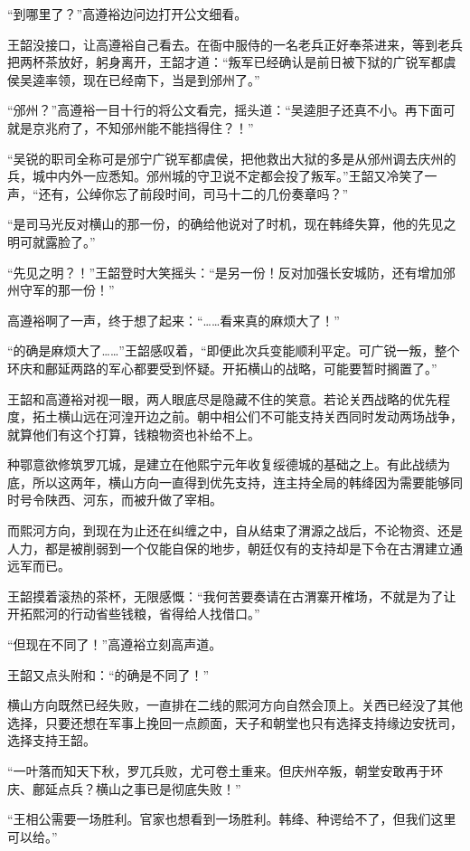 “到哪里了？”高遵裕边问边打开公文细看。

王韶没接口，让高遵裕自己看去。在衙中服侍的一名老兵正好奉茶进来，等到老兵把两杯茶放好，躬身离开，王韶才道：“叛军已经确认是前日被下狱的广锐军都虞侯吴逵率领，现在已经南下，当是到邠州了。”

“邠州？”高遵裕一目十行的将公文看完，摇头道：“吴逵胆子还真不小。再下面可就是京兆府了，不知邠州能不能挡得住？！”

“吴锐的职司全称可是邠宁广锐军都虞侯，把他救出大狱的多是从邠州调去庆州的兵，城中内外一应悉知。邠州城的守卫说不定都会投了叛军。”王韶又冷笑了一声，“还有，公绰你忘了前段时间，司马十二的几份奏章吗？”

“是司马光反对横山的那一份，的确给他说对了时机，现在韩绛失算，他的先见之明可就露脸了。”

“先见之明？！”王韶登时大笑摇头：“是另一份！反对加强长安城防，还有增加邠州守军的那一份！”

高遵裕啊了一声，终于想了起来：“……看来真的麻烦大了！”

“的确是麻烦大了……”王韶感叹着，“即便此次兵变能顺利平定。可广锐一叛，整个环庆和鄜延两路的军心都要受到怀疑。开拓横山的战略，可能要暂时搁置了。”

王韶和高遵裕对视一眼，两人眼底尽是隐藏不住的笑意。若论关西战略的优先程度，拓土横山远在河湟开边之前。朝中相公们不可能支持关西同时发动两场战争，就算他们有这个打算，钱粮物资也补给不上。

种鄂意欲修筑罗兀城，是建立在他熙宁元年收复绥德城的基础之上。有此战绩为底，所以这两年，横山方向一直得到优先支持，连主持全局的韩绛因为需要能够同时号令陕西、河东，而被升做了宰相。

而熙河方向，到现在为止还在纠缠之中，自从结束了渭源之战后，不论物资、还是人力，都是被削弱到一个仅能自保的地步，朝廷仅有的支持却是下令在古渭建立通远军而已。

王韶摸着滚热的茶杯，无限感慨：“我何苦要奏请在古渭寨开榷场，不就是为了让开拓熙河的行动省些钱粮，省得给人找借口。”

“但现在不同了！”高遵裕立刻高声道。

王韶又点头附和：“的确是不同了！”

横山方向既然已经失败，一直排在二线的熙河方向自然会顶上。关西已经没了其他选择，只要还想在军事上挽回一点颜面，天子和朝堂也只有选择支持缘边安抚司，选择支持王韶。

“一叶落而知天下秋，罗兀兵败，尤可卷土重来。但庆州卒叛，朝堂安敢再于环庆、鄜延点兵？横山之事已是彻底失败！”

“王相公需要一场胜利。官家也想看到一场胜利。韩绛、种谔给不了，但我们这里可以给。”

